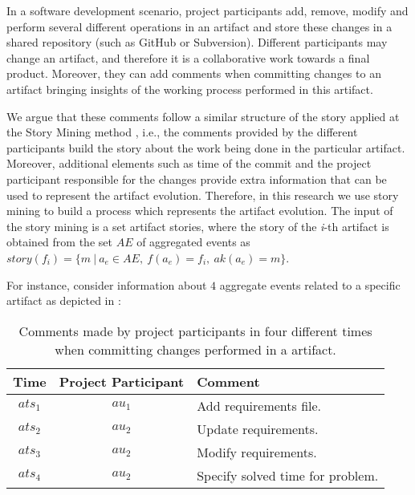 
In a software development scenario, project participants add, remove, modify and perform several different operations in an artifact and store these changes in a shared repository (such as GitHub or Subversion). Different participants may change an artifact, and therefore it is a collaborative work towards a final product. Moreover, they can add comments when committing changes to an artifact bringing insights of the working process performed in this artifact.

We argue that these comments 
follow a similar structure of the story applied at the Story Mining method  \cite{Goncalves2011} , i.e., the comments provided by the different participants build the story about the work being done in the particular artifact. Moreover, additional elements such as time of the commit and the project participant responsible for the changes provide extra information that can be used to represent the artifact evolution. Therefore, in this research we use story mining to build a process which represents the artifact evolution. The input of the story mining is a set artifact stories, where the story of the \emph{i}-th artifact is obtained from the set $AE$ of aggregated events as $ story({f_i}) = \lbrace {m ~|~ a_e \in AE,~ f(a_e) = f_i,~ ak(a_e)=m} \rbrace$.


For instance, consider information about $4$ aggregate events related to a specific artifact as depicted in :

\begin{table}[!h]
	\caption{Comments made by project participants in four different times when committing changes performed in a artifact.}
	\label{table:ExampleOfComments}
\begin{center}
\begin{tabular}{|c|c|l|}
Time & Project Participant & Comment\\\hline
$ats_1$ & $au_1$ & Add requirements file. \\
$ats_2$ & $au_2$ &Update requirements.\\
$ats_3$ & $au_2$ &Modify requirements.\\
$ats_4$ & $au_2$ &Specify solved time for problem.\\
\end{tabular}
\end{center}
  
\end{table}

